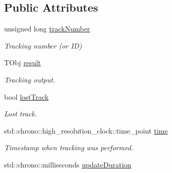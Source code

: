 \subsection*{Public Attributes}
\begin{DoxyCompactItemize}
\item 
\hypertarget{struct_vision_core_1_1_abstractions_1_1_tracking_data_a3e29783a97919194b94c3f141ea12515}{}unsigned long \hyperlink{struct_vision_core_1_1_abstractions_1_1_tracking_data_a3e29783a97919194b94c3f141ea12515}{track\+Number}\label{struct_vision_core_1_1_abstractions_1_1_tracking_data_a3e29783a97919194b94c3f141ea12515}

\begin{DoxyCompactList}\small\item\em Tracking number (or I\+D) \end{DoxyCompactList}\item 
\hypertarget{struct_vision_core_1_1_abstractions_1_1_tracking_data_a9bdd7269d8470d6cfd2ca094cf86e9ee}{}T\+Obj \hyperlink{struct_vision_core_1_1_abstractions_1_1_tracking_data_a9bdd7269d8470d6cfd2ca094cf86e9ee}{result}\label{struct_vision_core_1_1_abstractions_1_1_tracking_data_a9bdd7269d8470d6cfd2ca094cf86e9ee}

\begin{DoxyCompactList}\small\item\em Tracking output. \end{DoxyCompactList}\item 
\hypertarget{struct_vision_core_1_1_abstractions_1_1_tracking_data_ae48c78f8d08da8f1f99ba3367b241e28}{}bool \hyperlink{struct_vision_core_1_1_abstractions_1_1_tracking_data_ae48c78f8d08da8f1f99ba3367b241e28}{lost\+Track}\label{struct_vision_core_1_1_abstractions_1_1_tracking_data_ae48c78f8d08da8f1f99ba3367b241e28}

\begin{DoxyCompactList}\small\item\em Lost track. \end{DoxyCompactList}\item 
\hypertarget{struct_vision_core_1_1_abstractions_1_1_tracking_data_af19c07021635b43df099e62283c93341}{}std\+::chrono\+::high\+\_\+resolution\+\_\+clock\+::time\+\_\+point \hyperlink{struct_vision_core_1_1_abstractions_1_1_tracking_data_af19c07021635b43df099e62283c93341}{time}\label{struct_vision_core_1_1_abstractions_1_1_tracking_data_af19c07021635b43df099e62283c93341}

\begin{DoxyCompactList}\small\item\em Timestamp when tracking was performed. \end{DoxyCompactList}\item 
\hypertarget{struct_vision_core_1_1_abstractions_1_1_tracking_data_ac112fbe77985f84f5c2079cb836225be}{}std\+::chrono\+::milliseconds \hyperlink{struct_vision_core_1_1_abstractions_1_1_tracking_data_ac112fbe77985f84f5c2079cb836225be}{update\+Duration}\label{struct_vision_core_1_1_abstractions_1_1_tracking_data_ac112fbe77985f84f5c2079cb836225be}


\end{DoxyCompactItemize}
